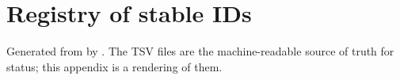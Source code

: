\section{Registry of stable IDs}\label{app:registry}
Generated from  by . The TSV files are the machine-readable source of truth for status; this appendix is a rendering of them.

